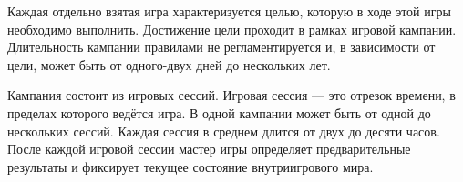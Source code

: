 Каждая отдельно взятая игра характеризуется целью, которую в ходе этой игры необходимо выполнить. Достижение цели проходит в рамках игровой кампании. Длительность кампании правилами не регламентируется и, в зависимости от цели, может быть от одного-двух дней до нескольких лет.

Кампания состоит из игровых сессий. Игровая сессия — это отрезок времени, в пределах которого ведётся игра. В одной кампании может быть от одной до нескольких сессий. Каждая сессия в среднем длится от двух до десяти часов. После каждой игровой сессии мастер игры определяет предварительные результаты и фиксирует текущее состояние внутриигрового мира.
